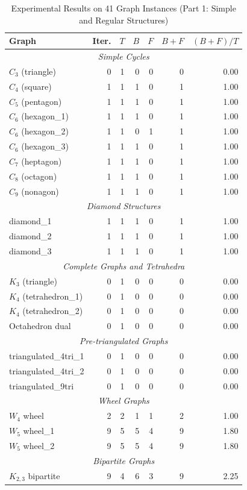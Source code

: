 \documentclass[12pt,a4paper]{article}
\theoremstyle{definition}
\theoremstyle{remark}
\begin{document}
\begin{table}[p]
\centering
\small
\caption{Experimental Results on 41 Graph Instances (Part 1: Simple and Regular Structures)}
\label{tab:experimental_results_part1}
\begin{tabular}{|l|r|r|r|r|r|r|}
\hline
\textbf{Graph} & \textbf{Iter.} & \textbf{$T$} & \textbf{$B$} & \textbf{$F$} & \textbf{$B+F$} & \textbf{$(B+F)/T$} \\
\hline
\multicolumn{7}{|c|}{\textit{Simple Cycles}} \\
\hline
$C_3$ (triangle) & 0 & 1 & 0 & 0 & 0 & 0.00 \\
$C_4$ (square) & 1 & 1 & 1 & 0 & 1 & 1.00 \\
$C_5$ (pentagon) & 1 & 1 & 1 & 0 & 1 & 1.00 \\
$C_6$ (hexagon\_1) & 1 & 1 & 1 & 0 & 1 & 1.00 \\
$C_6$ (hexagon\_2) & 1 & 1 & 0 & 1 & 1 & 1.00 \\
$C_6$ (hexagon\_3) & 1 & 1 & 1 & 0 & 1 & 1.00 \\
$C_7$ (heptagon) & 1 & 1 & 1 & 0 & 1 & 1.00 \\
$C_8$ (octagon) & 1 & 1 & 1 & 0 & 1 & 1.00 \\
$C_9$ (nonagon) & 1 & 1 & 1 & 0 & 1 & 1.00 \\
\hline
\multicolumn{7}{|c|}{\textit{Diamond Structures}} \\
\hline
diamond\_1 & 1 & 1 & 1 & 0 & 1 & 1.00 \\
diamond\_2 & 1 & 1 & 1 & 0 & 1 & 1.00 \\
diamond\_3 & 1 & 1 & 1 & 0 & 1 & 1.00 \\
\hline
\multicolumn{7}{|c|}{\textit{Complete Graphs and Tetrahedra}} \\
\hline
$K_3$ (triangle) & 0 & 1 & 0 & 0 & 0 & 0.00 \\
$K_4$ (tetrahedron\_1) & 0 & 1 & 0 & 0 & 0 & 0.00 \\
$K_4$ (tetrahedron\_2) & 0 & 1 & 0 & 0 & 0 & 0.00 \\
Octahedron dual & 0 & 1 & 0 & 0 & 0 & 0.00 \\
\hline
\multicolumn{7}{|c|}{\textit{Pre-triangulated Graphs}} \\
\hline
triangulated\_4tri\_1 & 0 & 1 & 0 & 0 & 0 & 0.00 \\
triangulated\_4tri\_2 & 0 & 1 & 0 & 0 & 0 & 0.00 \\
triangulated\_9tri & 0 & 1 & 0 & 0 & 0 & 0.00 \\
\hline
\multicolumn{7}{|c|}{\textit{Wheel Graphs}} \\
\hline
$W_4$ wheel & 2 & 2 & 1 & 1 & 2 & 1.00 \\
$W_5$ wheel\_1 & 9 & 5 & 5 & 4 & 9 & 1.80 \\
$W_5$ wheel\_2 & 9 & 5 & 5 & 4 & 9 & 1.80 \\
\hline
\multicolumn{7}{|c|}{\textit{Bipartite Graphs}} \\
\hline
$K_{2,3}$ bipartite & 9 & 4 & 6 & 3 & 9 & 2.25 \\
\hline
\end{tabular}
\end{table}
\end{document}
